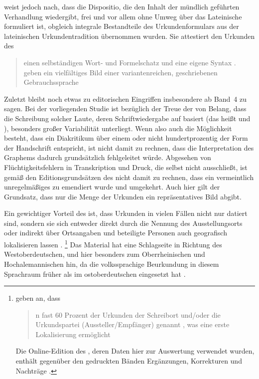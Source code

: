 \citet[13, 25--38]{schulze2011} weist jedoch nach, dass die Dispositio, die den
Inhalt der mündlich geführten Verhandlung wiedergibt, frei und
vor allem ohne Umweg über das Lateinische
formuliert ist, obgleich integrale Bestandteile des
Urkundenformulars aus der lateinischen
Urkundentradition übernommen wurden. Sie attestiert den Urkunden des \CAO{}
\blockcquote[3]{schulze1994}{einen selbständigen Wort- und Formelschatz und
eine eigene Syntax \textelp{}.  geben ein vielfältiges
Bild einer variantenreichen, geschriebenen
Gebrauchs\-sprache}.

Zuletzt bleibt noch etwas zu editorischen Eingriffen
insbesondere ab Band~4\nocite{cao4} zu sagen. Bei der vorliegenden Studie ist
bezüglich der Treue der  von Belang, dass die Schreibung
solcher Laute, deren Schriftwiedergabe auf  basiert (das heißt  und ), besonders großer Variabilität unterliegt.
Wenn also auch die Möglichkeit besteht, dass ein Diakritikum über einem 
oder  nicht hundertprozentig der Form der Handschrift entspricht, ist
nicht damit zu rechnen, dass die Interpretation des Graphems dadurch
grundsätzlich fehlgeleitet würde. Abgesehen von %
Flüchtigkeitsfehlern in Transkription und Druck, die selbst \citet[\RN{60},
\RN{78}]{wilhelm1932} nicht ausschließt, ist gemäß den
Editionsgrundsätzen des \CAO{} nicht damit zu rechnen,
dass ein vermeintlich unregelmäßiges  zu  emendiert wurde und
umgekehrt. Auch hier gilt der Grundsatz, dass nur die Menge der Urkunden ein
repräsentatives Bild abgibt.

Ein gewichtiger Vorteil des \CAO{} ist, dass Urkunden in vielen
Fällen nicht nur datiert sind, sondern sie sich entweder direkt durch die
Nennung des Ausstellungsorts oder indirekt über Ortsangaben und beteiligte
Personen auch geografisch lokalisieren lassen
\autocite[16]{schulze2011}.%
%
	\footnote{\citet[393]{gniffkerapp2005} geben an, dass
	\blockquote{n fast 60 Prozent der Urkunden
	\textelp{} der Schreibort und/oder die Urkundspartei (Aussteller/Empfänger)
	genannt , was eine erste Lokalisierung ermöglicht}. Die
	Online-Edition des \CAO{}, deren Daten hier zur Auswertung verwendet
	wurden, enthält gegenüber den gedruckten Bänden Ergänzungen, Korrekturen
	und Nachträge \autocite[vgl.][393--394]{gniffkerapp2005}.}
%
Das Material hat eine Schlagseite in Richtung des
Westoberdeutschen, und hier besonders zum
Oberrheinischen und Hochalemannischen hin, da
die volkssprachige Beurkundung in diesem
Sprachraum früher als im ostoberdeutschen
eingesetzt hat \autocites[1774]{skala1985}[15]{schulze2011}.

